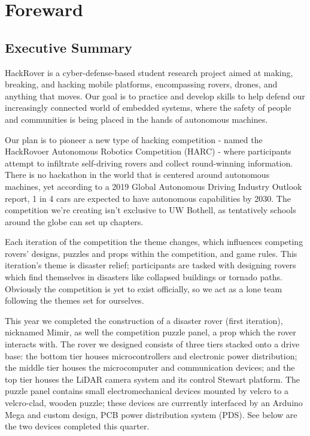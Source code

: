 \documentclass[a4paper, 10pt]{article}
\begin{document}
\begin{titlepage}
\end{titlepage}

\pagebreak{}

\tableofcontents

\pagebreak{}

\section*{Foreward}
	\subsection*{Executive Summary}
	HackRover is a cyber-defense-based student research project aimed at making, breaking, and hacking mobile platforms, encompassing rovers, drones, and anything that moves. Our goal is to practice and develop skills to help defend our increasingly connected world of embedded systems, where the safety of people and communities is being placed in the hands of autonomous machines.
	
	Our plan is to pioneer a new type of hacking competition - named the HackRovoer Autonomous Robotics Competition (HARC) - where participants attempt to infiltrate self-driving rovers and collect round-winning information. There is no hackathon in the world that is centered around autonomous machines, yet according to a 2019 Global Autonomous Driving Industry Outlook report, 1 in 4 cars are expected to have autonomous capabilities by 2030. The competition we’re creating isn’t exclusive to UW Bothell, as tentatively schools around the globe can set up chapters. 
	
	Each iteration of the competition the theme changes, which influences competing rovers' designs, puzzles and props within the competition, and game rules. This iteration's theme is disaster relief; participants are tasked with designing rovers which find themselves in disasters like collapsed buildings or tornado paths. Obviously the competition is yet to exist officially, so we act as a lone team following the themes set for ourselves. 
	
	This year we completed the construction of a disaster rover (first iteration), nicknamed Mimir, as well the competition puzzle panel, a prop which the rover interacts with. The rover we designed consists of three tiers stacked onto a drive base: the bottom tier houses microcontrollers and electronic power distribution; the middle tier houses the microcomputer and communication devices; and the top tier houses the LiDAR camera system and its control Stewart platform. The puzzle panel contains small electromechanical devices mounted by velcro to a velcro-clad, wooden puzzle; these devices are currrently interfaced by an Arduino Mega and custom design, PCB power distribution system (PDS). See below are the two devices completed this quarter.
\end{document}
